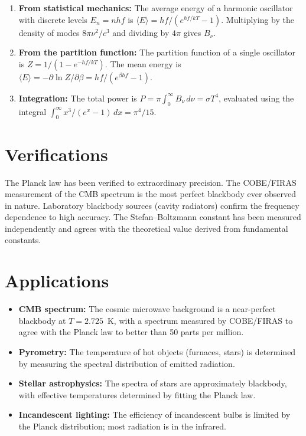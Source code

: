 \begin{enumerate}
  \item \textbf{From statistical mechanics:} The average energy of a harmonic oscillator with discrete levels $E_{n} = nhf$ is $\langle E\rangle = hf/(e^{hf/kT} - 1)$. Multiplying by the density of modes $8\pi\nu^{2}/c^{3}$ and dividing by $4\pi$ gives $B_{\nu}$.
  \item \textbf{From the partition function:} The partition function of a single oscillator is $Z = 1/(1 - e^{-hf/kT})$. The mean energy is $\langle E\rangle = -\partial\ln Z/\partial\beta = hf/(e^{\beta hf} - 1)$.
  \item \textbf{Integration:} The total power is $P = \pi\int_{0}^{\infty} B_{\nu}\,d\nu = \sigma T^{4}$, evaluated using the integral $\int_{0}^{\infty} x^{3}/(e^{x}-1)\,dx = \pi^{4}/15$.
\end{enumerate}
\section*{Verifications}

The Planck law has been verified to extraordinary precision. The COBE/FIRAS measurement of the CMB spectrum is the most perfect blackbody ever observed in nature. Laboratory blackbody sources (cavity radiators) confirm the frequency dependence to high accuracy. The Stefan--Boltzmann constant has been measured independently and agrees with the theoretical value derived from fundamental constants.
\section*{Applications}

\begin{itemize}
  \item \textbf{CMB spectrum:} The cosmic microwave background is a near-perfect blackbody at $T = 2.725$~K, with a spectrum measured by COBE/FIRAS to agree with the Planck law to better than 50 parts per million.
  \item \textbf{Pyrometry:} The temperature of hot objects (furnaces, stars) is determined by measuring the spectral distribution of emitted radiation.
  \item \textbf{Stellar astrophysics:} The spectra of stars are approximately blackbody, with effective temperatures determined by fitting the Planck law.
  \item \textbf{Incandescent lighting:} The efficiency of incandescent bulbs is limited by the Planck distribution; most radiation is in the infrared.
\end{itemize}
